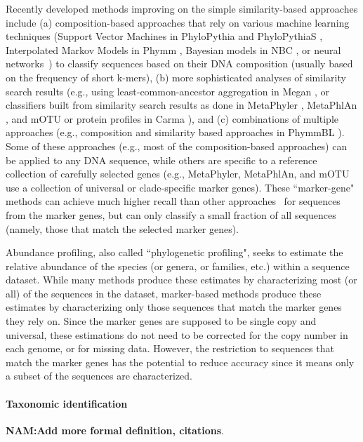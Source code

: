 Recently developed methods improving
on the simple similarity-based approaches include 
(a) composition-based approaches that rely on
various machine learning techniques 
(Support Vector Machines in
PhyloPythia and PhyloPythiaS \cite{McHardy2007a, Patil2011}, 
Interpolated Markov Models in Phymm 
\cite{Brady2011},
Bayesian models in NBC \cite{Rosen2011}, or neural networks~\cite{SOM2006}) to
classify sequences based on their DNA composition (usually based on
the frequency of short k-mers),
(b)  more sophisticated analyses of
similarity search results (e.g., using least-common-ancestor
aggregation in Megan \cite{Huson2007}, or classifiers built from similarity
search results as done in MetaPhyler \cite{Liu2011d,Liu2011}, 
MetaPhlAn \cite{Segata2012a}, and mOTU \cite{Sunagawa2013}
or protein profiles in Carma \cite{Gerlach2011b}), and
(c) combinations of
multiple approaches (e.g., composition and similarity based approaches
in PhymmBL \cite{Brady2009}).  
Some of these approaches (e.g., most of the
composition-based approaches) can be applied to any DNA sequence,
while others are specific to a reference collection of carefully
selected genes (e.g., MetaPhyler, MetaPhlAn, and mOTU use a collection of
universal or clade-specific marker genes).  These
``marker-gene" methods can
achieve much higher recall than other
approaches~\cite{Liu2011d} for sequences from the marker genes, but 
can only classify a small
fraction of all sequences (namely, those that match the 
selected marker genes). 

Abundance profiling, also called ``phylogenetic profiling", 
seeks to estimate the relative
abundance of the species (or
genera, or families, etc.) within a sequence dataset.
While many methods produce these estimates by characterizing
most (or all) of the sequences in the dataset, marker-based methods
produce these estimates by characterizing only those
sequences that match the marker genes they rely on.
Since the marker genes are supposed to be single
copy and universal, these estimations do not need to
be corrected for the copy number in each genome, or for
missing data. 
However, the restriction to sequences that match the marker genes
has the potential to reduce accuracy since it means only a subset
of the sequences are characterized.

\paragraph{Taxonomic identification}\label{back:taxonomic_id}
\textbf{NAM:Add more formal definition, citations}.
